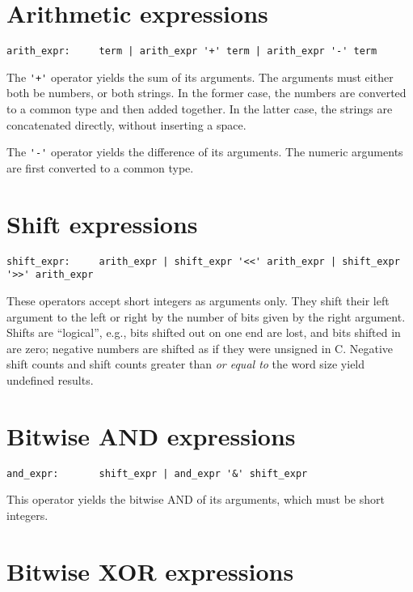 \section{Arithmetic expressions}

\begin{verbatim}
arith_expr:     term | arith_expr '+' term | arith_expr '-' term
\end{verbatim}

The \verb|'+'| operator yields the sum of its arguments.
The arguments must either both be numbers, or both strings.
In the former case, the numbers are converted to a common type
and then added together.
In the latter case, the strings are concatenated directly,
without inserting a space.

The \verb|'-'| operator yields the difference of its arguments.
The numeric arguments are first converted to a common type.

\section{Shift expressions}

\begin{verbatim}
shift_expr:     arith_expr | shift_expr '<<' arith_expr | shift_expr '>>' arith_expr
\end{verbatim}

These operators accept short integers as arguments only.
They shift their left argument to the left or right by the number of bits
given by the right argument.  Shifts are ``logical'', e.g., bits shifted
out on one end are lost, and bits shifted in are zero;
negative numbers are shifted as if they were unsigned in C.
Negative shift counts and shift counts greater than {\em or equal to}
the word size yield undefined results.

\section{Bitwise AND expressions}

\begin{verbatim}
and_expr:       shift_expr | and_expr '&' shift_expr
\end{verbatim}

This operator yields the bitwise AND of its arguments,
which must be short integers.

\section{Bitwise XOR expressions}

